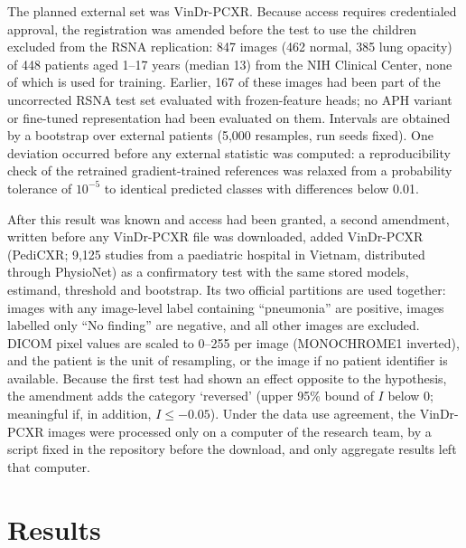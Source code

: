 \documentclass[preprint,12pt]{elsarticle}
\begin{document}
The planned external set was VinDr-PCXR. Because access requires credentialed approval, the registration was amended before the test to use the children excluded from the RSNA replication: 847 images (462 normal, 385 lung opacity) of 448 patients aged 1--17 years (median 13) from the NIH Clinical Center, none of which is used for training. Earlier, 167 of these images had been part of the uncorrected RSNA test set evaluated with frozen-feature heads; no APH variant or fine-tuned representation had been evaluated on them. Intervals are obtained by a bootstrap over external patients (5,000 resamples, run seeds fixed). One deviation occurred before any external statistic was computed: a reproducibility check of the retrained gradient-trained references was relaxed from a probability tolerance of $10^{-5}$ to identical predicted classes with differences below 0.01.

After this result was known and access had been granted, a second amendment, written before any VinDr-PCXR file was downloaded, added VinDr-PCXR (PediCXR; 9,125 studies from a paediatric hospital in Vietnam, distributed through PhysioNet) \citep{pham2023pedicxr,goldberger2000physionet} as a confirmatory test with the same stored models, estimand, threshold and bootstrap. Its two official partitions are used together: images with any image-level label containing ``pneumonia'' are positive, images labelled only ``No finding'' are negative, and all other images are excluded. DICOM pixel values are scaled to 0--255 per image (MONOCHROME1 inverted), and the patient is the unit of resampling, or the image if no patient identifier is available. Because the first test had shown an effect opposite to the hypothesis, the amendment adds the category `reversed' (upper 95\% bound of $I$ below 0; meaningful if, in addition, $I\le-0.05$). Under the data use agreement, the VinDr-PCXR images were processed only on a computer of the research team, by a script fixed in the repository before the download, and only aggregate results left that computer.

\section{Results}\label{sec:results}
\end{document}

